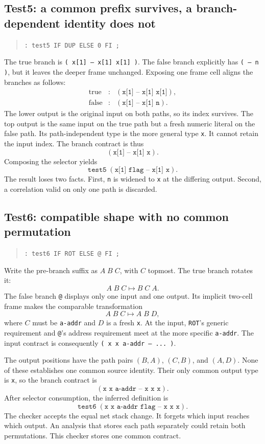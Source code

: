 \documentclass[11pt,a4paper]{article}
\newcommand{\effect}[1]{\mbox{\texttt{#1}}}
\begin{document}
\subsection{Test5: a common prefix survives, a branch-dependent
identity does not}

\begin{quote}
\texttt{: test5  IF DUP ELSE 0 FI ;}
\end{quote}
The true branch is
\effect{( x[1] -- x[1] x[1] )}.  The false branch explicitly has
\effect{( -- n )}, but it leaves the deeper frame unchanged.  Exposing one
frame cell aligns the branches as follows:
\[
\begin{array}{rcl}
 \text{true}  &:& (\texttt{x[1] -- x[1] x[1]}),\\
 \text{false} &:& (\texttt{x[1] -- x[1] n}).
\end{array}
\]
The lower output is the original input on both paths, so its index survives.
The top output is the same input on the true path but a fresh numeric literal
on the false path.  Its path-independent type is the more general type
\texttt{x}.  It cannot retain the input index.  The branch contract is thus
\[
                       (\texttt{x[1] -- x[1] x}).
\]
Composing the selector yields
\[
             \texttt{test5}\;(\texttt{x[1] flag -- x[1] x}).
\]
The result loses two facts.  First, \texttt{n} is widened to \texttt{x} at the
differing output.  Second, a correlation valid on only one path is discarded.

\subsection{Test6: compatible shape with no common permutation}

\begin{quote}
\texttt{: test6  IF ROT ELSE @ FI ;}
\end{quote}
Write the pre-branch suffix as $A\;B\;C$, with $C$ topmost.  The true branch
rotates it:
\[
                         A\;B\;C \longmapsto B\;C\;A.
\]
The false branch \texttt{@} displays only one input and one output.  Its
implicit two-cell frame makes the comparable transformation
\[
                         A\;B\;C \longmapsto A\;B\;D,
\]
where $C$ must be \texttt{a-addr} and $D$ is a fresh \texttt{x}.  At the input,
\texttt{ROT}'s generic requirement and \texttt{@}'s address requirement meet
at the more specific \texttt{a-addr}.  The input contract is consequently
\effect{( x x a-addr -- ... )}.

The output positions have the path pairs $(B,A)$, $(C,B)$, and $(A,D)$.  None
of these establishes one common source identity.  Their only common output
type is \texttt{x}, so the branch contract is
\[
                  (\texttt{x x a-addr -- x x x}).
\]
After selector consumption, the inferred definition is
\[
       \texttt{test6}\;(\texttt{x x a-addr flag -- x x x}).
\]
The checker accepts the equal net stack change.  It forgets which input reaches
which output.  An analysis that stores each path separately could retain both
permutations.  This checker stores one common contract.
\end{document}
